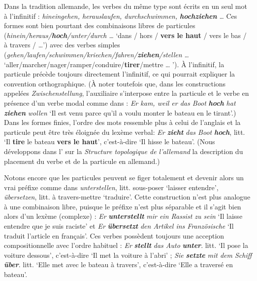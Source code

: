 {    Dans la tradition allemande, les verbes du même type sont écrits en un seul mot à l’infinitif : \textit{hineingehen, herauslaufen, durchschwimmen,} \textbf{\textit{hoch\-ziehen}} \textit{…} Ces formes sont bien pourtant des combinaisons libres de particules (\textit{hinein/heraus/}\textbf{\textit{hoch}}\textit{/unter/durch} \textit{…} ‘dans / hors / \textbf{vers le haut} / vers le bas / à travers / …’) avec des verbes simples (\textit{gehen/laufen/schwimmen/kriechen/fahren/}\textbf{\textit{ziehen}}\textit{/stellen} \textit{…} ‘aller/marcher/nager/ramper/conduire/\textbf{tirer}/mettre … ’). À l’infinitif, la particule précède toujours directement l’infinitif, ce qui pourrait expliquer la convention orthographique. (À noter toutefois que, dans les constructions appelées \textit{Zwischenstellung}, l’auxiliaire s’interpose entre la particule et le verbe en présence d’un verbe modal comme dans : \textit{Er kam, weil er das Boot} \textbf{\textit{hoch}} \textit{hat} \textbf{\textit{ziehen}} \textit{wollen} ‘Il est venu parce qu’il a voulu monter le bateau en le tirant’.) Dans les formes finies, l’ordre des mots ressemble plus à celui de l’anglais et la particule peut être très éloignée du lexème verbal: \textit{Er} \textbf{\textit{zieht}} \textit{das Boot} \textbf{\textit{hoch}}, litt. ‘Il \textbf{tire} le bateau \textbf{vers le haut}’, c’est-à-dire ‘Il hisse le bateau’. (Nous développons dans l' sur la \textit{Structure topologique de l’allemand} la description du placement du verbe et de la particule en allemand.)

    Notons encore que les particules peuvent se figer totalement et devenir alors un vrai préfixe comme dans \textit{unterstellen}, litt. sous-poser ‘laisser entendre’, \textit{übersetzen}, litt. à travers-mettre ‘traduire’. Cette construction n’est plus analogue à une combinaison libre, puisque le préfixe n’est plus séparable et il s’agit bien alors d’un lexème (complexe) : \textit{Er} \textbf{\textit{unterstellt}} \textit{mir ein Rassist zu sein} ‘Il laisse entendre que je suis raciste’ et \textit{Er} \textbf{\textit{übersetzt}} \textit{den Artikel ins Französische} ‘Il traduit l’article en français’. Ces verbes possèdent toujours une acception compositionnelle avec l’ordre habituel : \textit{Er} \textbf{\textit{stellt}} \textit{das Auto} \textbf{\textit{unter}}. litt. ‘Il pose la voiture dessous’, c’est-à-dire ‘Il met la voiture à l’abri’ ; \textit{Sie} \textbf{\textit{setzte}} \textit{mit dem Schiff} \textbf{\textit{über}}. litt. ‘Elle met avec le bateau à travers’, c’est-à-dire ‘Elle a traversé en bateau’.

}

